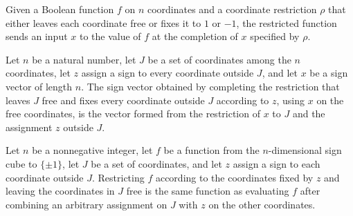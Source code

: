 \begin{definition}
\label{FABL.CoordRestriction.restrictSign}
\leanok
{}
Given a Boolean function $f$ on $n$ coordinates and a coordinate restriction $\rho$ that
either leaves each coordinate free or fixes it to $1$ or $-1$, the restricted function
sends an input $x$ to the value of $f$ at the completion of $x$ specified by $\rho$.
\end{definition}

\begin{theorem}
\label{FABL.CoordRestriction.completeSign_coordRestrictionOf}
\leanok
{}
Let $n$ be a natural number, let $J$ be a set of coordinates among the $n$ coordinates,
let $z$ assign a sign to every coordinate outside $J$, and let $x$ be a sign vector of
length $n$. The sign vector obtained by completing the restriction that leaves $J$ free
and fixes every coordinate outside $J$ according to $z$, using $x$ on the free
coordinates, is the vector formed from the restriction of $x$ to $J$ and the assignment
$z$ outside $J$.
\end{theorem}

\begin{theorem}
\label{FABL.CoordRestriction.restrictSign_coordRestrictionOf}
\leanok
{}
Let $n$ be a nonnegative integer, let $f$ be a function from the $n$-dimensional sign
cube to $\{\pm1\}$, let $J$ be a set of coordinates, and let $z$ assign a sign to each
coordinate outside $J$. Restricting $f$ according to the coordinates fixed by $z$ and
leaving the coordinates in $J$ free is the same function as evaluating $f$ after
combining an arbitrary assignment on $J$ with $z$ on the other coordinates.
\end{theorem}

